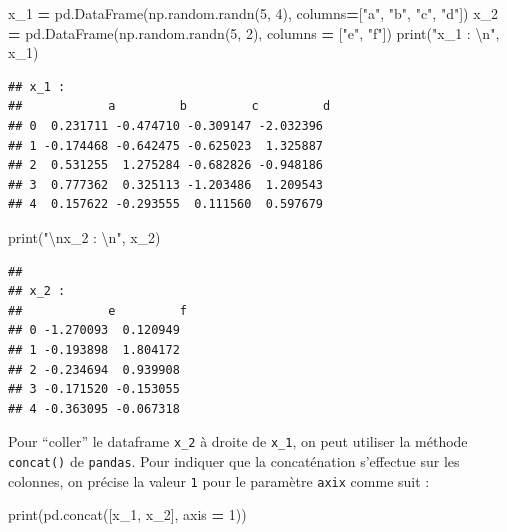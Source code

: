 \documentclass[12pt,]{book}
\newenvironment{Shaded}{\begin{snugshade}}{\end{snugshade}}
\newcommand{\DecValTok}[1]{\textcolor[rgb]{0.00,0.00,0.81}{#1}}
\newcommand{\CharTok}[1]{\textcolor[rgb]{0.31,0.60,0.02}{#1}}
\newcommand{\StringTok}[1]{\textcolor[rgb]{0.31,0.60,0.02}{#1}}
\newcommand{\OperatorTok}[1]{\textcolor[rgb]{0.81,0.36,0.00}{\textbf{#1}}}
\newcommand{\BuiltInTok}[1]{#1}
\newcommand{\NormalTok}[1]{#1}
\numberwithin{equation}{section}
\numberwithin{countremarque}{section}
\begin{document}
\begin{Shaded}
\begin{Highlighting}[]
\NormalTok{x_1 }\OperatorTok{=}\NormalTok{ pd.DataFrame(np.random.randn(}\DecValTok{5}\NormalTok{, }\DecValTok{4}\NormalTok{),}
\NormalTok{                   columns}\OperatorTok{=}\NormalTok{[}\StringTok{"a"}\NormalTok{, }\StringTok{"b"}\NormalTok{, }\StringTok{"c"}\NormalTok{, }\StringTok{"d"}\NormalTok{])}
\NormalTok{x_2 }\OperatorTok{=}\NormalTok{ pd.DataFrame(np.random.randn(}\DecValTok{5}\NormalTok{, }\DecValTok{2}\NormalTok{),}
\NormalTok{                   columns }\OperatorTok{=}\NormalTok{ [}\StringTok{"e"}\NormalTok{, }\StringTok{"f"}\NormalTok{])}
\BuiltInTok{print}\NormalTok{(}\StringTok{"x_1 : }\CharTok{\textbackslash{}n}\StringTok{"}\NormalTok{, x_1)}
\end{Highlighting}
\end{Shaded}

\begin{lstlisting}
## x_1 : 
##            a         b         c         d
## 0  0.231711 -0.474710 -0.309147 -2.032396
## 1 -0.174468 -0.642475 -0.625023  1.325887
## 2  0.531255  1.275284 -0.682826 -0.948186
## 3  0.777362  0.325113 -1.203486  1.209543
## 4  0.157622 -0.293555  0.111560  0.597679
\end{lstlisting}

\begin{Shaded}
\begin{Highlighting}[]
\BuiltInTok{print}\NormalTok{(}\StringTok{"}\CharTok{\textbackslash{}n}\StringTok{x_2 : }\CharTok{\textbackslash{}n}\StringTok{"}\NormalTok{, x_2)}
\end{Highlighting}
\end{Shaded}

\begin{lstlisting}
## 
## x_2 : 
##            e         f
## 0 -1.270093  0.120949
## 1 -0.193898  1.804172
## 2 -0.234694  0.939908
## 3 -0.171520 -0.153055
## 4 -0.363095 -0.067318
\end{lstlisting}

Pour ``coller'' le dataframe \texttt{x\_2} à droite de \texttt{x\_1}, on
peut utiliser la méthode \texttt{concat()} de \texttt{pandas}. Pour
indiquer que la concaténation s'effectue sur les colonnes, on précise la
valeur \texttt{1} pour le paramètre \texttt{axix} comme suit :

\begin{Shaded}
\begin{Highlighting}[]
\BuiltInTok{print}\NormalTok{(pd.concat([x_1, x_2], axis }\OperatorTok{=} \DecValTok{1}\NormalTok{))}
\end{Highlighting}
\end{Shaded}
\end{document}
